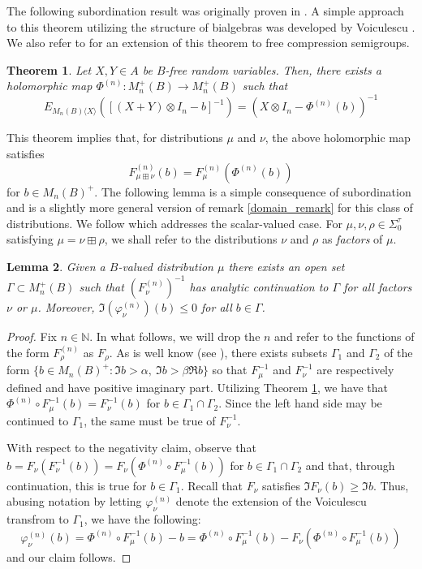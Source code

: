 \documentclass[11pt]{amsart}
\newtheorem{theorem}{Theorem}[section]
\newtheorem{lemma}[theorem]{Lemma}
\begin{document}
The following subordination result was originally proven in \cite{Bi}. A simple approach to this theorem
utilizing the structure of bialgebras was developed by Voiculescu \cite{vo4}.  We also refer to \cite{SC} for an extension of this
theorem to free compression semigroups.

\begin{theorem}\label{sub}
Let $X,Y \in A$ be $B$-free random variables.  Then, there exists a holomorphic map 
$\Phi^{(n)}:M_{n}^{+}(B) \rightarrow M_{n}^{+}(B)$ such that 
$$E_{M_{n}(B)\langle X \rangle} ([(X+Y)\otimes I_{n} - b]^{-1}) = (X \otimes I_{n} - \Phi^{(n)}(b))^{-1}$$
\end{theorem}

This theorem implies that, for distributions $\mu$ and $\nu$, the above holomorphic map satisfies
$$F^{(n)}_{\mu \boxplus \nu}(b) = F^{(n)}_{\mu}(\Phi^{(n)}(b)) $$ for $b\in M_{n}(B)^{+}$.  The following lemma is
a simple consequence of subordination and is a slightly more general version of remark \ref{domain_remark} for this class of distributions.
  We follow \cite{Wil2} which addresses the scalar-valued case.  For $\mu,\nu, \rho \in \Sigma_{0}^{\tau}$ satisfying $\mu = \nu \boxplus \rho$, we shall 
refer to the distributions $\nu$ and $\rho$ as \textit{factors} of $\mu$.
\begin{lemma}
Given a $B$-valued distribution $\mu$ there exists an open set $\Gamma \subset M_{n}^{+}(B)$ such that
$(F_{\nu}^{(n)})^{-1}$ has analytic continuation to $\Gamma$ for all factors $\nu$ or $\mu$.  Moreover, 
$\Im(\varphi_{\nu}^{(n)})(b) \leq 0$ for all $b\in \Gamma$.
\end{lemma}
\begin{proof}
Fix $n\in \mathbb{N}$.  In what follows, we will drop the $n$ and refer to the functions of the form $F_{\rho}^{(n)}$ as $F_{\rho}$.
As is well know (see \cite{vo5}), there exists subsets $\Gamma_{1}$ and $\Gamma_{2}$ of the form $\{b \in M_{n}(B)^{+}: \Im{b} > \alpha , \ \Im{b} > \beta \Re{b} \}$
so that $F_{\mu}^{-1}$ and $F_{\nu}^{-1}$ are respectively defined and have positive imaginary part.  
Utilizing Theorem \ref{sub}, we have that $\Phi^{(n)} \circ F_{\mu}^{-1}(b) = F_{\nu}^{-1}(b)$ for $b\in \Gamma_{1} \cap \Gamma_{2}$.  Since
the left hand side may be continued to $\Gamma_{1}$, the same must be true of $F_{\nu}^{-1}$.

With respect to the negativity claim, observe that $b = F_{\nu}(F_{\nu}^{-1}(b)) = F_{\nu}(\Phi^{(n)} \circ F_{\mu}^{-1}(b))$ for $b\in \Gamma_{1} \cap \Gamma_{2}$
and that, through continuation, this is true for $b\in \Gamma_{1}$.  Recall that $F_{\nu}$ satisfies $\Im F_{\nu}(b)\geq \Im b$.  Thus, abusing notation by letting
$\varphi_{\nu}^{(n)}$ denote the extension of the Voiculescu transfrom to $\Gamma_{1}$, we have the following:
$$\varphi_{\nu}^{(n)}(b) = \Phi^{(n)} \circ F_{\mu}^{-1}(b) - b = \Phi^{(n)} \circ F_{\mu}^{-1}(b) - F_{\nu}(\Phi^{(n)} \circ F_{\mu}^{-1}(b))$$
and our claim follows.
\end{proof}
\end{document}

